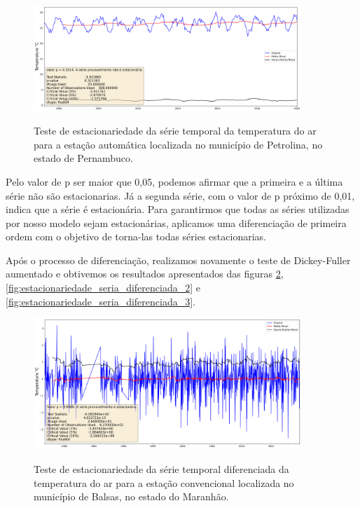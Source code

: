\begin{figure}[H]
    \centering
    \caption{Teste de estacionariedade da série temporal da temperatura do ar para a estação automática localizada no município de Petrolina, no estado de Pernambuco.}
    \includegraphics[width=0.9\textwidth]{figuras/dickey_fuller_raw_712f3e11658051636f09732a60fb3c1b.png}
    \label{fig:estacionariedade_seria_original_3}
\end{figure}

Pelo valor de p ser maior que 0,05, podemos afirmar que a primeira e a última série não são estacionarias. Já a segunda série, com o valor de p próximo de 0,01, indica que a série é estacionária. Para garantirmos que todas as séries utilizadas por nosso modelo sejam estacionárias, aplicamos uma diferenciação de primeira ordem com o objetivo de torna-las todas séries estacionarias. 

Após o processo de diferenciação, realizamos novamente o teste de Dickey-Fuller aumentado e obtivemos os resultados apresentados das figuras \ref{fig:estacionariedade_seria_diferenciada_1}, \ref{fig:estacionariedade_seria_diferenciada_2} e \ref{fig:estacionariedade_seria_diferenciada_3}.  

\begin{figure}[H]
    \centering
    \caption{Teste de estacionariedade da série temporal diferenciada da temperatura do ar para a estação convencional localizada no município de Balsas, no estado do Maranhão.}
    \includegraphics[width=0.9\textwidth]{figuras/dickey_fuller_diff_82768.png}
    \label{fig:estacionariedade_seria_diferenciada_1}
\end{figure}

